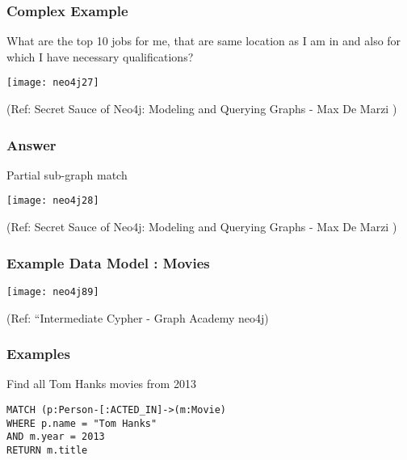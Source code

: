 \begin{frame}[fragile]\frametitle{Complex Example}
What are the top 10 jobs for me, that are same location as I am in and also for which I have necessary qualifications?

\begin{center}
\texttt{[image: neo4j27]}
\end{center}	    



{\tiny (Ref: Secret Sauce of Neo4j: Modeling and Querying Graphs
 - Max De Marzi )}

\end{frame}

\begin{frame}[fragile]\frametitle{Answer}

Partial sub-graph match

\begin{center}
\texttt{[image: neo4j28]}
\end{center}	    


{\tiny (Ref: Secret Sauce of Neo4j: Modeling and Querying Graphs
 - Max De Marzi )}

\end{frame}


\begin{frame}\frametitle{Example Data Model : Movies}

\begin{center}
\texttt{[image: neo4j89]}
\end{center}	

{\tiny (Ref: ``Intermediate Cypher - Graph Academy neo4j)}
\end{frame}

\begin{frame}[fragile]\frametitle{Examples}

Find all Tom Hanks movies from 2013

\begin{lstlisting}
MATCH (p:Person-[:ACTED_IN]->(m:Movie)
WHERE p.name = "Tom Hanks"
AND m.year = 2013
RETURN m.title
\end{lstlisting}	

\end{frame}

